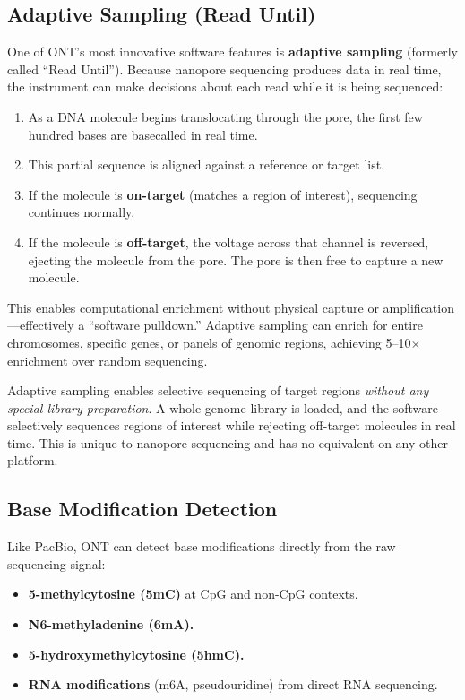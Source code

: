 \subsection{Adaptive Sampling (Read Until)}

One of ONT's most innovative software features is \textbf{adaptive sampling} (formerly called ``Read Until''). Because nanopore sequencing produces data in real time, the instrument can make decisions about each read while it is being sequenced:

\begin{enumerate}[nosep]
  \item As a DNA molecule begins translocating through the pore, the first few hundred bases are basecalled in real time.
  \item This partial sequence is aligned against a reference or target list.
  \item If the molecule is \textbf{on-target} (matches a region of interest), sequencing continues normally.
  \item If the molecule is \textbf{off-target}, the voltage across that channel is reversed, ejecting the molecule from the pore. The pore is then free to capture a new molecule.
\end{enumerate}

This enables computational enrichment without physical capture or amplification---effectively a ``software pulldown.'' Adaptive sampling can enrich for entire chromosomes, specific genes, or panels of genomic regions, achieving 5--10$\times$ enrichment over random sequencing.

\begin{keyconcept}[title={Adaptive Sampling}]
Adaptive sampling enables selective sequencing of target regions \emph{without any special library preparation}. A whole-genome library is loaded, and the software selectively sequences regions of interest while rejecting off-target molecules in real time. This is unique to nanopore sequencing and has no equivalent on any other platform.
\end{keyconcept}

\subsection{Base Modification Detection}

Like PacBio, ONT can detect base modifications directly from the raw sequencing signal:

\begin{itemize}[nosep]
  \item \textbf{5-methylcytosine (5mC)} at CpG and non-CpG contexts.
  \item \textbf{N6-methyladenine (6mA).}
  \item \textbf{5-hydroxymethylcytosine (5hmC).}
  \item \textbf{RNA modifications} (m6A, pseudouridine) from direct RNA sequencing.
\end{itemize}

